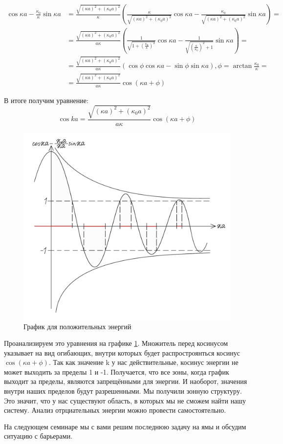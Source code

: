 \begin{align*}
    \cos \kappa a - \frac{\kappa_0}{\kappa}\sin\kappa a & = \frac{\sqrt{(\kappa a)^2 + (\kappa_0 a)^2}}{\kappa}\left( \frac{\kappa}{\sqrt{(\kappa a)^2 + (\kappa_0 a)^2}}\cos \kappa a -  \frac{\kappa_0}{\sqrt{(\kappa a)^2 + (\kappa_0 a)^2}}\sin \kappa a\right) = \\
    & = \frac{\sqrt{(\kappa a)^2 + (\kappa_0 a)^2}}{a\kappa}\left( \frac{1}{\sqrt{1 + (\frac{\kappa_0}{\kappa})^2}}\cos \kappa a -  \frac{1}{\sqrt{(\frac{\kappa}{\kappa_0})^2 + 1}}\sin \kappa a\right) = \\
    & = \frac{\sqrt{(\kappa a)^2 + (\kappa_0 a)^2}}{a\kappa}\left( \cos\phi \cos\kappa a -  \sin\phi\sin \kappa a\right), \phi = \arctan \frac{\kappa_0}{\kappa} =\\
    & =  \frac{\sqrt{(\kappa a)^2 + (\kappa_0 a)^2}}{a\kappa}\cos (\kappa a + \phi)
\end{align*}

В итоге получим уравнение:
\[
\cos ka = \frac{\sqrt{(\kappa a)^2 + (\kappa_0 a)^2}}{a\kappa}\cos (\kappa a + \phi)
\]

\begin{figure}[!ht]
\centering
\includegraphics[scale=0.23]{class_4/images/pos energy delta.png}
\caption{График для положительных энергий}
\label{fig 4.6}
\end{figure}
Проанализируем это уравнения на графике \ref{fig 4.6}. Множитель перед косинусом указывает на вид огибающих, внутри которых будет распростроянться косинус $\cos (\kappa a + \phi)$. Так как значение k у нас действительные, косинус энергии не может выходить за пределы 1 и -1. Получается, что все зоны, когда график выходит за пределы, являются запрещёнными для энергии. И наоборот, значения внутри наших пределов будут разрешенными. Мы получили зонную структуру. Это значит, что у нас существуют область, в которых мы не сможем найти нашу систему. Анализ отрциательных энергии можно провести самостоятельно.

На следующем семинаре мы с вами решим последнюю задачу на ямы и обсудим ситуацию с барьерами.